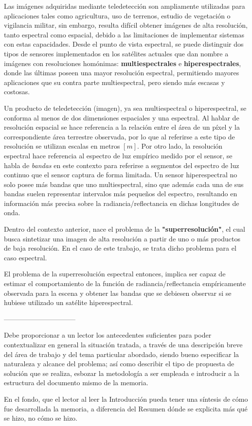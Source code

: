 Las imágenes adquiridas mediante teledetección son ampliamente utilizadas para aplicaciones tales como agricultura, uso de terrenos, estudio de vegetación o vigilancia militar, sin embargo, resulta difícil obtener imágenes de alta resolución, tanto espectral como espacial, debido a las limitaciones de implementar sistemas con estas capacidades. Desde el punto de vista espectral, se puede distinguir dos tipos de sensores implementados en los satélites actuales que dan nombre a imágenes con resoluciones homónimas: \textbf{multiespectrales} e \textbf{hiperespectrales}, donde las últimas poseen una mayor resolución espectral, permitiendo mayores aplicaciones que su contra parte multiespectral, pero siendo más escasas y costosas.

Un producto de teledetección (imagen), ya sea multiespectral o hiperespectral, se conforma al menos de dos dimensiones espaciales y una espectral. Al hablar de resolución espacial se hace referencia a la relación entre el área de un píxel y la correspondiente área terrestre observada, por lo que al referirse a este tipo de resolución se utilizan escalas en metros $[m]$. Por otro lado, la resolución espectral hace referencia al espectro de luz empírico medido por el sensor, se habla de \textit{bandas} en este contexto para referirse a segmentos del espectro de luz continuo que el sensor captura de forma limitada. Un sensor hiperespectral no solo posee más bandas que uno multiespectral, sino que además cada una de sus bandas suelen representar intervalos más pequeños del espectro, resultando en información más precisa sobre la radiancia/reflectancia en dichas longitudes de onda.

Dentro del contexto anterior, nace el problema de la \textbf{"superresolución"}, el cual busca sintetizar una imagen de alta resolución a partir de uno o más productos de baja resolución. En el caso de este trabajo, se trata dicho problema para el caso espectral.

El problema de la superresolución espectral entonces, implica ser capaz de estimar el comportamiento de la función de radiancia/reflectancia empíricamente observada para la escena y obtener las bandas que se debiesen observar si se hubiese utilizado un satélite hiperespectral.

--------------------------------

Debe proporcionar a un lector los antecedentes suficientes para poder contextualizar en general la situación tratada, a través de una descripción breve del área de trabajo y del tema particular abordado, siendo bueno especificar la naturaleza y alcance del problema; así como describir el tipo de propuesta de solución que se realiza, esbozar la metodología a ser empleada e introducir a la estructura del documento mismo de la memoria.

En el fondo, que el lector al leer la Introducción pueda tener una síntesis de cómo fue desarrollada la memoria, a diferencia del Resumen dónde se explicita más qué se hizo, no cómo se hizo.
